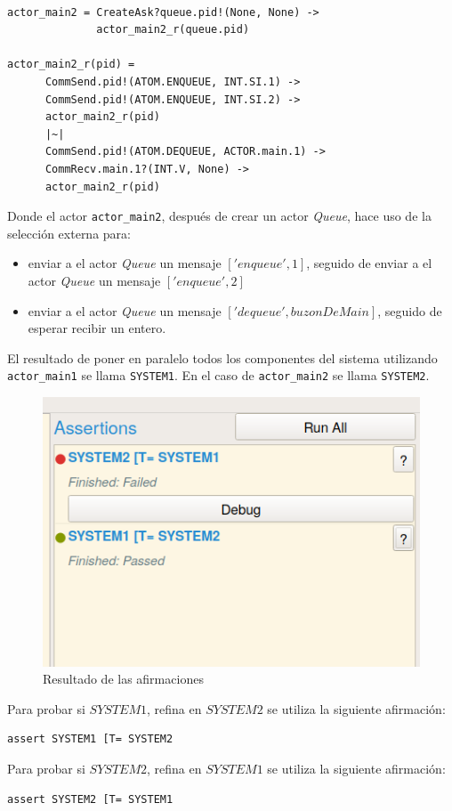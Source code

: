 \begin{verbatim}

actor_main2 = CreateAsk?queue.pid!(None, None) ->
              actor_main2_r(queue.pid)

actor_main2_r(pid) =
      CommSend.pid!(ATOM.ENQUEUE, INT.SI.1) -> 
      CommSend.pid!(ATOM.ENQUEUE, INT.SI.2) -> 
      actor_main2_r(pid) 
      |~|
      CommSend.pid!(ATOM.DEQUEUE, ACTOR.main.1) -> 
      CommRecv.main.1?(INT.V, None) -> 
      actor_main2_r(pid)
\end{verbatim}

Donde el actor \verb=actor_main2=, después de crear un actor \textit{Queue}, hace uso de la selección externa para:
\begin{itemize}
 \item enviar a el actor \textit{Queue} un mensaje $['enqueue', 1]$, seguido de enviar a el actor \textit{Queue} un mensaje $['enqueue', 2]$
 \item enviar a el actor \textit{Queue} un mensaje $['dequeue', buzonDeMain]$, seguido de esperar recibir un entero.
\end{itemize}

El resultado de poner en paralelo todos los componentes del sistema utilizando \verb=actor_main1= se llama \verb=SYSTEM1=. En el caso de \verb=actor_main2= se llama \verb=SYSTEM2=.

\begin{figure}[H]
\begin{center}
\includegraphics[width=5 cm]{img/trazas.png}
\caption{Resultado de las afirmaciones}\label{modelo:verifica}
\end{center}
\end{figure}

Para probar si $SYSTEM1$, refina en $SYSTEM2$ se utiliza la siguiente afirmación:

\begin{verbatim}
assert SYSTEM1 [T= SYSTEM2 
\end{verbatim}

Para probar si $SYSTEM2$, refina en $SYSTEM1$ se utiliza la siguiente afirmación:

\begin{verbatim}
assert SYSTEM2 [T= SYSTEM1 
\end{verbatim}

